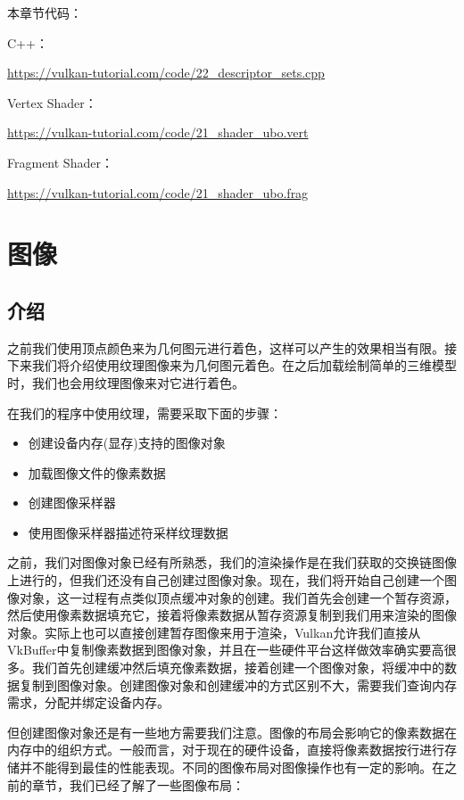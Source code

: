 \documentclass{ctexart}
\begin{document}
本章节代码：

C++：

\url{https://vulkan-tutorial.com/code/22_descriptor_sets.cpp}

Vertex Shader：

\url{https://vulkan-tutorial.com/code/21_shader_ubo.vert}

Fragment Shader：

\url{https://vulkan-tutorial.com/code/21_shader_ubo.frag}

\newpage
\section{图像}

\subsection{介绍}

之前我们使用顶点颜色来为几何图元进行着色，这样可以产生的效果相当有限。接下来我们将介绍使用纹理图像来为几何图元着色。在之后加载绘制简单的三维模型时，我们也会用纹理图像来对它进行着色。

在我们的程序中使用纹理，需要采取下面的步骤：

\begin{itemize}
	\item 创建设备内存(显存)支持的图像对象
	\item 加载图像文件的像素数据
	\item 创建图像采样器
	\item 使用图像采样器描述符采样纹理数据
\end{itemize}

之前，我们对图像对象已经有所熟悉，我们的渲染操作是在我们获取的交换链图像上进行的，但我们还没有自己创建过图像对象。现在，我们将开始自己创建一个图像对象，这一过程有点类似顶点缓冲对象的创建。我们首先会创建一个暂存资源，然后使用像素数据填充它，接着将像素数据从暂存资源复制到我们用来渲染的图像对象。实际上也可以直接创建暂存图像来用于渲染，Vulkan允许我们直接从VkBuffer中复制像素数据到图像对象，并且在一些硬件平台这样做效率确实要高很多。我们首先创建缓冲然后填充像素数据，接着创建一个图像对象，将缓冲中的数据复制到图像对象。创建图像对象和创建缓冲的方式区别不大，需要我们查询内存需求，分配并绑定设备内存。

但创建图像对象还是有一些地方需要我们注意。图像的布局会影响它的像素数据在内存中的组织方式。一般而言，对于现在的硬件设备，直接将像素数据按行进行存储并不能得到最佳的性能表现。不同的图像布局对图像操作也有一定的影响。在之前的章节，我们已经了解了一些图像布局：
\end{document}
